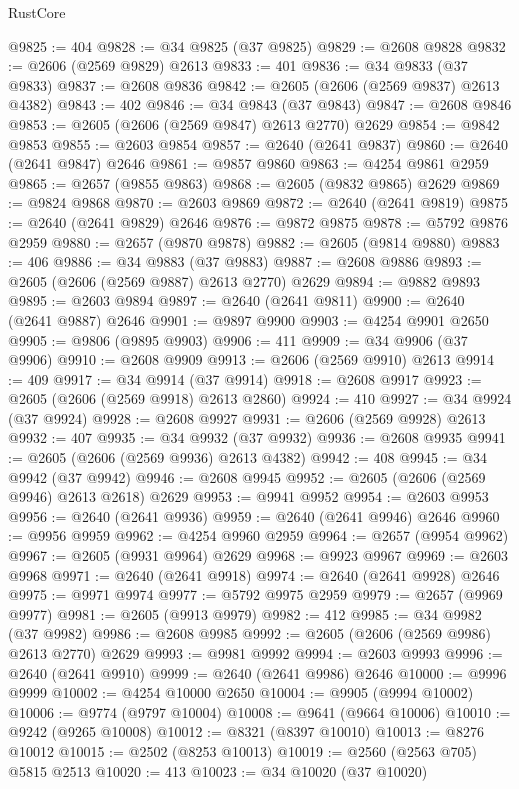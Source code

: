 \begin{lexlean}{RustCore}
\begin{coremodule}
@9825 := 404
@9828 := @34 @9825 (@37 @9825)
@9829 := @2608 @9828
@9832 := @2606 (@2569 @9829) @2613
@9833 := 401
@9836 := @34 @9833 (@37 @9833)
@9837 := @2608 @9836
@9842 := @2605 (@2606 (@2569 @9837) @2613 @4382)
@9843 := 402
@9846 := @34 @9843 (@37 @9843)
@9847 := @2608 @9846
@9853 := @2605 (@2606 (@2569 @9847) @2613 @2770) @2629
@9854 := @9842 @9853
@9855 := @2603 @9854
@9857 := @2640 (@2641 @9837)
@9860 := @2640 (@2641 @9847) @2646
@9861 := @9857 @9860
@9863 := @4254 @9861 @2959
@9865 := @2657 (@9855 @9863)
@9868 := @2605 (@9832 @9865) @2629
@9869 := @9824 @9868
@9870 := @2603 @9869
@9872 := @2640 (@2641 @9819)
@9875 := @2640 (@2641 @9829) @2646
@9876 := @9872 @9875
@9878 := @5792 @9876 @2959
@9880 := @2657 (@9870 @9878)
@9882 := @2605 (@9814 @9880)
@9883 := 406
@9886 := @34 @9883 (@37 @9883)
@9887 := @2608 @9886
@9893 := @2605 (@2606 (@2569 @9887) @2613 @2770) @2629
@9894 := @9882 @9893
@9895 := @2603 @9894
@9897 := @2640 (@2641 @9811)
@9900 := @2640 (@2641 @9887) @2646
@9901 := @9897 @9900
@9903 := @4254 @9901 @2650
@9905 := @9806 (@9895 @9903)
@9906 := 411
@9909 := @34 @9906 (@37 @9906)
@9910 := @2608 @9909
@9913 := @2606 (@2569 @9910) @2613
@9914 := 409
@9917 := @34 @9914 (@37 @9914)
@9918 := @2608 @9917
@9923 := @2605 (@2606 (@2569 @9918) @2613 @2860)
@9924 := 410
@9927 := @34 @9924 (@37 @9924)
@9928 := @2608 @9927
@9931 := @2606 (@2569 @9928) @2613
@9932 := 407
@9935 := @34 @9932 (@37 @9932)
@9936 := @2608 @9935
@9941 := @2605 (@2606 (@2569 @9936) @2613 @4382)
@9942 := 408
@9945 := @34 @9942 (@37 @9942)
@9946 := @2608 @9945
@9952 := @2605 (@2606 (@2569 @9946) @2613 @2618) @2629
@9953 := @9941 @9952
@9954 := @2603 @9953
@9956 := @2640 (@2641 @9936)
@9959 := @2640 (@2641 @9946) @2646
@9960 := @9956 @9959
@9962 := @4254 @9960 @2959
@9964 := @2657 (@9954 @9962)
@9967 := @2605 (@9931 @9964) @2629
@9968 := @9923 @9967
@9969 := @2603 @9968
@9971 := @2640 (@2641 @9918)
@9974 := @2640 (@2641 @9928) @2646
@9975 := @9971 @9974
@9977 := @5792 @9975 @2959
@9979 := @2657 (@9969 @9977)
@9981 := @2605 (@9913 @9979)
@9982 := 412
@9985 := @34 @9982 (@37 @9982)
@9986 := @2608 @9985
@9992 := @2605 (@2606 (@2569 @9986) @2613 @2770) @2629
@9993 := @9981 @9992
@9994 := @2603 @9993
@9996 := @2640 (@2641 @9910)
@9999 := @2640 (@2641 @9986) @2646
@10000 := @9996 @9999
@10002 := @4254 @10000 @2650
@10004 := @9905 (@9994 @10002)
@10006 := @9774 (@9797 @10004)
@10008 := @9641 (@9664 @10006)
@10010 := @9242 (@9265 @10008)
@10012 := @8321 (@8397 @10010)
@10013 := @8276 @10012
@10015 := @2502 (@8253 @10013)
@10019 := @2560 (@2563 @705) @5815 @2513
@10020 := 413
@10023 := @34 @10020 (@37 @10020)

\end{coremodule}
\end{lexlean}
